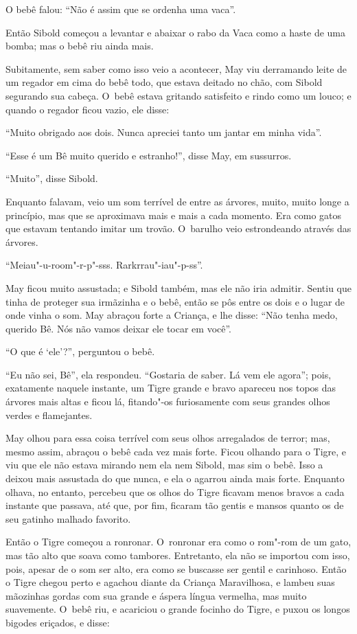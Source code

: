 O bebê falou: ``Não é assim que se ordenha uma vaca''.

Então Sibold começou a levantar e abaixar o rabo da Vaca como a haste de
uma bomba; mas o bebê riu ainda mais.

Subitamente, sem saber como isso veio a acontecer, May viu derramando
leite de um regador em cima do bebê todo, que estava deitado no chão,
com Sibold segurando sua cabeça. O~bebê estava gritando satisfeito e
rindo como um louco; e quando o regador ficou vazio, ele disse:

``Muito obrigado aos dois. Nunca apreciei tanto um jantar em minha
vida''.

``Esse é um Bê muito querido e estranho!'', disse May, em sussurros.

``Muito'', disse Sibold.

Enquanto falavam, veio um som terrível de entre as árvores, muito, muito
longe a princípio, mas que se aproximava mais e mais a cada momento. Era
como gatos que estavam tentando imitar um trovão. O~barulho veio
estrondeando através das árvores.

``Meiau"-u-room"-r-p"-sss. Rarkrrau"-iau"-p-ss''.

May ficou muito assustada; e Sibold também, mas ele não iria admitir.
Sentiu que tinha de proteger sua irmãzinha e o bebê, então se pôs entre
os dois e o lugar de onde vinha o som. May abraçou forte a Criança, e
lhe disse: ``Não tenha medo, querido Bê. Nós não vamos deixar ele tocar
em você''.

``O que é `ele'?'', perguntou o bebê.

``Eu não sei, Bê'', ela respondeu. ``Gostaria de saber. Lá vem ele
agora''; pois, exatamente naquele instante, um Tigre grande e bravo
apareceu nos topos das árvores mais altas e ficou lá, fitando"-os
furiosamente com seus grandes olhos verdes e flamejantes.

May olhou para essa coisa terrível com seus olhos arregalados de terror;
mas, mesmo assim, abraçou o bebê cada vez mais forte. Ficou olhando para
o Tigre, e viu que ele não estava mirando nem ela nem Sibold, mas sim o
bebê. Isso a deixou mais assustada do que nunca, e ela o agarrou ainda
mais forte. Enquanto olhava, no entanto, percebeu que os olhos do Tigre
ficavam menos bravos a cada instante que passava, até que, por fim,
ficaram tão gentis e mansos quanto os de seu gatinho malhado favorito.

Então o Tigre começou a ronronar. O~ronronar era como o rom"-rom de um
gato, mas tão alto que soava como tambores. Entretanto, ela não se
importou com isso, pois, apesar de o som ser alto, era como se buscasse
ser gentil e carinhoso. Então o Tigre chegou perto e agachou diante da
Criança Maravilhosa, e lambeu suas mãozinhas gordas com sua grande e
áspera língua vermelha, mas muito suavemente. O~bebê riu, e acariciou o
grande focinho do Tigre, e puxou os longos bigodes eriçados, e disse:

